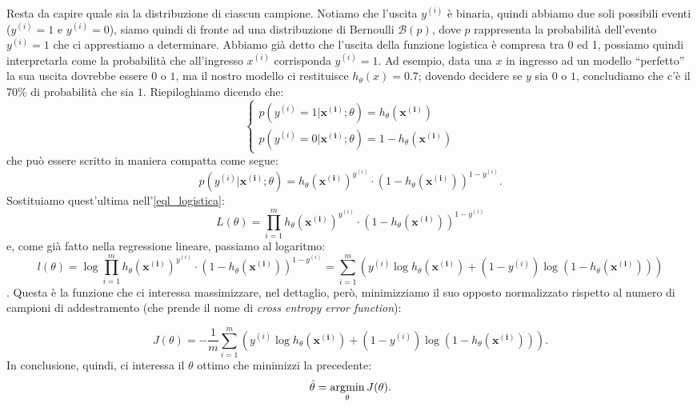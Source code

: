 Resta da capire quale sia la distribuzione di ciascun campione. Notiamo che l'uscita $y^{(i)}$ è binaria, quindi abbiamo due soli possibili eventi ($y^{(i)}=1$ e $y^{(i)}=0$), siamo quindi di fronte ad una distribuzione di Bernoulli $\mathcal{B}(p)$, dove $p$ rappresenta la probabilità dell'evento $y^{(i)}=1$ che ci apprestiamo a determinare. Abbiamo già detto che l'uscita della funzione logistica è compresa tra 0 ed 1, possiamo quindi interpretarla come la probabilità che all'ingresso $x^{(i)}$ corrisponda $y^{(i)}=1$. Ad esempio, data una $x$ in ingresso ad un modello ``perfetto'' la sua uscita dovrebbe essere $0$ o $1$, ma il nostro modello ci restituisce $h_\theta(x)=0.7$; dovendo decidere se $y$ sia $0$ o $1$, concludiamo che c'è il 70\% di probabilità che sia $1$. 
Riepiloghiamo dicendo che:
\begin{equation*}
\begin{cases}
p(y^{(i)}=1|\mathbf{x^{(i)}};\theta) = h_\theta(\mathbf{x^{(i)}})  \\
p(y^{(i)}=0|\mathbf{x^{(i)}};\theta) = 1 - h_\theta(\mathbf{x^{(i)}})
\end{cases}
\end{equation*}
che può essere scritto in maniera compatta come segue:
\begin{equation*}
p(y^{(i)}|\mathbf{x^{(i)}};\theta) = h_\theta(\mathbf{x^{(i)}})^{y^{(i)}} \cdot (1 - h_\theta(\mathbf{x^{(i)}}))^{1-y^{(i)}}.
\end{equation*}
Sostituiamo quest'ultima nell'\autoref{eql_logistica}:
\begin{equation*}
 L(\theta) = \prod_{i=1}^m h_\theta(\mathbf{x^{(i)}})^{y^{(i)}} \cdot (1 - h_\theta(\mathbf{x^{(i)}}))^{1-y^{(i)}}
\end{equation*}
e, come già fatto nella regressione lineare, passiamo al logaritmo:
\begin{dmath*}
 l(\theta) = \log\prod_{i=1}^m h_\theta(\mathbf{x^{(i)}})^{y^{(i)}} \cdot (1 - h_\theta(\mathbf{x^{(i)}}))^{1-y^{(i)}}
 = \sum_{i=1}^m \left( {y^{(i)}}\log{h_\theta(\mathbf{x^{(i)}})} + (1-y^{(i)})
 \log{(1 - h_\theta(\mathbf{x^{(i)}}))} \right)
\end{dmath*}.
Questa è la funzione che ci interessa massimizzare, nel dettaglio, però, minimizziamo il suo opposto  normalizzato rispetto al numero di campioni di addestramento (che prende il nome di \emph{cross entropy error function}):

 \begin{equation*}
 J(\theta) = -\frac{1}{m}\sum_{i=1}^m \left( {y^{(i)}}\log{h_\theta(\mathbf{x^{(i)}})} + (1-y^{(i)})
 \log{(1 - h_\theta(\mathbf{x^{(i)}}))} \right).
\end{equation*}
In conclusione, quindi, ci interessa il $\theta$ ottimo che minimizzi la precedente:
\begin{equation*}
  \hat\theta = \operatorname*{arg\!\min}_\theta J(\theta).
\end{equation*}

